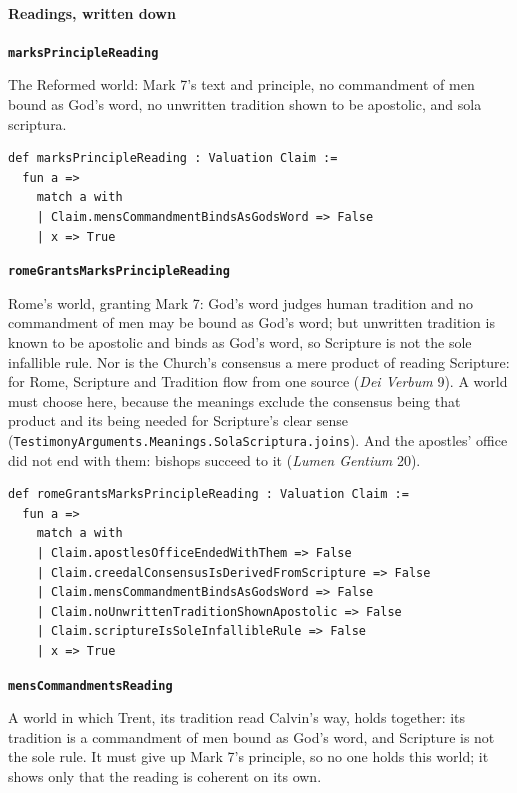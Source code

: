 \documentclass[11pt]{article}
\begin{document}
\paragraph*{Readings, written down}
\leavevmode\par\nobreak
\par\medskip\noindent\textbf{\texttt{marks\allowbreak{}Principle\allowbreak{}Reading}}\par\nobreak\noindent
The Reformed world: Mark 7’s text and principle, no commandment of men bound as God’s word, no unwritten tradition shown to be apostolic, and sola scriptura.

{\small\begin{verbatim}
def marksPrincipleReading : Valuation Claim :=
  fun a =>
    match a with
    | Claim.mensCommandmentBindsAsGodsWord => False
    | x => True
\end{verbatim}}
\par\medskip\noindent\textbf{\texttt{rome\allowbreak{}Grants\allowbreak{}Marks\allowbreak{}Principle\allowbreak{}Reading}}\par\nobreak\noindent
Rome’s world, granting Mark 7: God’s word judges human tradition and no commandment of men may be bound as God’s word; but unwritten tradition is known to be apostolic and binds as God’s word, so Scripture is not the sole infallible rule. Nor is the Church’s consensus a mere product of reading Scripture: for Rome, Scripture and Tradition flow from one source (\emph{Dei Verbum} 9). A world must choose here, because the meanings exclude the consensus being that product and its being needed for Scripture’s clear sense (\texttt{Testimony\allowbreak{}Arguments.Meanings.Sola\allowbreak{}Scriptura.joins}). And the apostles’ office did not end with them: bishops succeed to it (\emph{Lumen Gentium} 20).

{\small\begin{verbatim}
def romeGrantsMarksPrincipleReading : Valuation Claim :=
  fun a =>
    match a with
    | Claim.apostlesOfficeEndedWithThem => False
    | Claim.creedalConsensusIsDerivedFromScripture => False
    | Claim.mensCommandmentBindsAsGodsWord => False
    | Claim.noUnwrittenTraditionShownApostolic => False
    | Claim.scriptureIsSoleInfallibleRule => False
    | x => True
\end{verbatim}}
\par\medskip\noindent\textbf{\texttt{mens\allowbreak{}Commandments\allowbreak{}Reading}}\par\nobreak\noindent
A world in which Trent, its tradition read Calvin’s way, holds together: its tradition is a commandment of men bound as God’s word, and Scripture is not the sole rule. It must give up Mark 7’s principle, so no one holds this world; it shows only that the reading is coherent on its own.
\end{document}
